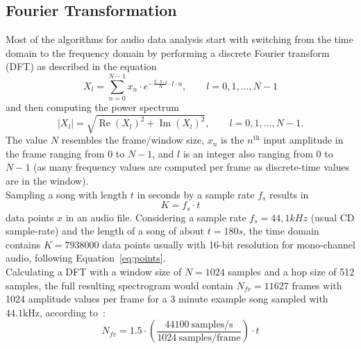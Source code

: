 \subsection{Fourier Transformation}\label{featsec}

Most of the algorithms for audio data analysis start with switching from the time domain to the frequency domain by performing a discrete Fourier transform (DFT) as described in the equation
\begin{equation} \label{eq:fft}
X_l = \sum_{n=0}^{N-1}{x_n \cdot e^ { - \frac{ 2 \cdot \pi \cdot i}{N}\cdot l\cdot n}}, \qquad l = 0,1,..., N-1
\end{equation}
and then computing the power spectrum
\begin{equation} \label{eq:absfft}
|X_l| = \sqrt{\operatorname{Re}(X_l)^2 + \operatorname{Im}(X_l)^2}, \qquad l = 0,1,..., N-1.
\end{equation}
The value $N$ resembles the frame/window size, $x_n$ is the $n^\text{th}$ input amplitude in the frame ranging from 0 to $N-1$, and $l$ is an integer also ranging from 0 to $N-1$ (as many frequency values are computed per frame as discrete-time values are in the window).\\
\noindent Sampling a song with length $t$ in seconds by a sample rate $f_s$ results in
\begin{equation} \label{eq:points}
K = f_s \cdot t
\end{equation}
data points $x$ in an audio file. Considering a sample rate $f_s = 44,1kHz$ (usual CD sample-rate) and the length of a song of about $t = 180s$, the time domain contains $K = 7938000$ data points usually with 16-bit resolution for mono-channel audio, following Equation~\eqref{eq:points}.\\
Calculating a DFT with a window size of $N = 1024$ samples and a hop size of 512 samples, the full resulting spectrogram would contain $N_{fv} = 11627$ frames with 1024 amplitude values per frame for a 3 minute example song sampled with $44.1 \text{kHz}$, according to~\cite[p. 56]{knees1}: %
\begin{equation} \label{eq:hop}
N_{fv} = 1.5 \cdot (\frac{44100 \ \text{samples/s}}{1024 \ \text{samples/frame}}) \cdot t
\end{equation}
